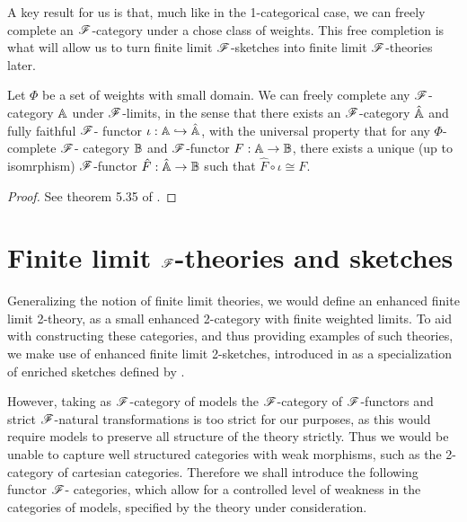 \documentclass[../thesis.tex]{subfiles}
\begin{document}
A key result for us is that, much like in the 1-categorical case, we can freely complete an ${\mathscr{F}}$-category
under a chose class of weights. This free completion is what will allow us to turn finite limit ${\mathscr{F}}$-sketches
into finite limit ${\mathscr{F}}$-theories later. 
\begin{theorem}\label{thm:free completion}
  Let $\Phi$ be a set of weights with small domain. We can freely complete any ${\mathscr{F}}$-category ${\mathbb{A}}$ under
  ${\mathscr{F}}$-limits, in the sense that there exists an ${\mathscr{F}}$-category $\hat{{\mathbb{A}}}$ and fully faithful ${\mathscr{F}}$-%
  functor $\iota : {\mathbb{A}} \hookrightarrow \hat {{\mathbb{A}}}$, with the universal property that for any $\Phi$-complete ${\mathscr{F}}$-%
  category ${\mathbb{B}}$ and ${\mathscr{F}}$-functor $F : {\mathbb{A}} \to {\mathbb{B}}$, there exists a unique (up to isomrphism) ${\mathscr{F}}$-functor
  $\hat F : \hat{{\mathbb{A}}} \to {\mathbb{B}}$ such that $\hat F \circ \iota \cong F$.
\end{theorem}
\begin{proof}
  See theorem 5.35 of \cite{kelly1982a}.
\end{proof}

\section{Finite limit \texorpdfstring{${\mathscr{F}}$}{F}-theories and sketches}\label{sec:F theories}
Generalizing the notion of finite limit theories, we would define an enhanced finite limit 2-theory,
as a small enhanced 2-category with finite weighted limits. To aid with constructing these categories,
and thus providing examples of such theories, we make use of enhanced finite limit 2-sketches, introduced
in \cite{arkor2024} as a specialization of enriched sketches defined by \cite{kelly1982a}. 

However, taking as ${\mathscr{F}}$-category of models the ${\mathscr{F}}$-category of ${\mathscr{F}}$-functors and strict ${\mathscr{F}}$-natural
transformations is too strict for our purposes, as this would require models to preserve all structure
of the theory strictly. Thus we would be unable to capture well structured categories with weak morphisms,
such as the 2-category of cartesian categories. Therefore we shall introduce the following functor ${\mathscr{F}}$-%
categories, which allow for a controlled level of weakness in the categories of models, specified by the
theory under consideration.
\end{document}
